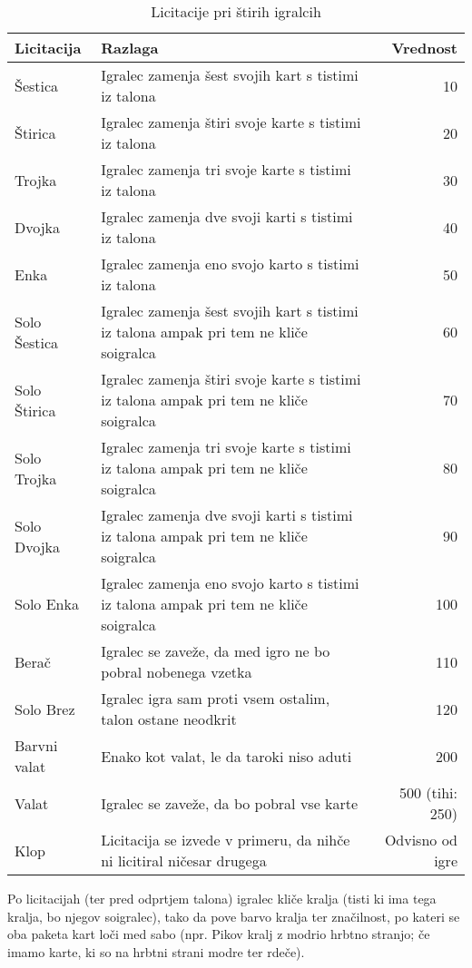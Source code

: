 \documentclass[a4paper, ]{report}
\begin{document}
\begin{table}
  \caption{Licitacije pri štirih igralcih}
  \begin{tabularx}{\textwidth}{lXr}
    \hline \hline
    \textbf{Licitacija} & \textbf{Razlaga} & \textbf{Vrednost} \\ \hline \hline
    Šestica & Igralec zamenja šest svojih kart s tistimi iz talona & 10 \\
    Štirica & Igralec zamenja štiri svoje karte s tistimi iz talona & 20 \\
    Trojka & Igralec zamenja tri svoje karte s tistimi iz talona & 30 \\
    Dvojka & Igralec zamenja dve svoji karti s tistimi iz talona & 40 \\
    Enka & Igralec zamenja eno svojo karto s tistimi iz talona & 50 \\
    Solo Šestica & Igralec zamenja šest svojih kart s tistimi iz talona ampak pri tem ne kliče soigralca & 60 \\
    Solo Štirica & Igralec zamenja štiri svoje karte s tistimi iz talona ampak pri tem ne kliče soigralca & 70 \\
    Solo Trojka & Igralec zamenja tri svoje karte s tistimi iz talona ampak pri tem ne kliče soigralca & 80 \\
    Solo Dvojka & Igralec zamenja dve svoji karti s tistimi iz talona ampak pri tem ne kliče soigralca & 90 \\
    Solo Enka & Igralec zamenja eno svojo karto s tistimi iz talona ampak pri tem ne kliče soigralca & 100 \\
    Berač & Igralec se zaveže, da med igro ne bo pobral nobenega vzetka & 110 \\
    Solo Brez & Igralec igra sam proti vsem ostalim, talon ostane neodkrit & 120 \\
    Barvni valat & Enako kot valat, le da taroki niso aduti & 200 \\
    Valat & Igralec se zaveže, da bo pobral vse karte & 500 (tihi: 250)\\
    Klop & Licitacija se izvede v primeru, da nihče ni licitiral ničesar drugega & Odvisno od igre \\ \hline \hline
  \end{tabularx}
\end{table}

Po licitacijah (ter pred odprtjem talona) igralec kliče kralja (tisti ki ima tega kralja, bo njegov soigralec), tako da pove barvo kralja ter značilnost, po kateri se oba paketa kart loči med sabo (npr. Pikov kralj z modrio hrbtno stranjo; če imamo karte, ki so na hrbtni strani modre ter rdeče).
\end{document}
